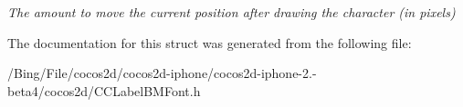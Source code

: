 \begin{DoxyCompactItemize}
\begin{DoxyCompactList}\small\item\em The amount to move the current position after drawing the character (in pixels) \end{DoxyCompactList}\end{DoxyCompactItemize}


The documentation for this struct was generated from the following file\-:\begin{DoxyCompactItemize}
\item 
/\-Bing/\-File/cocos2d/cocos2d-\/iphone/cocos2d-\/iphone-\/2.-\/beta4/cocos2d/C\-C\-Label\-B\-M\-Font.\-h\end{DoxyCompactItemize}

